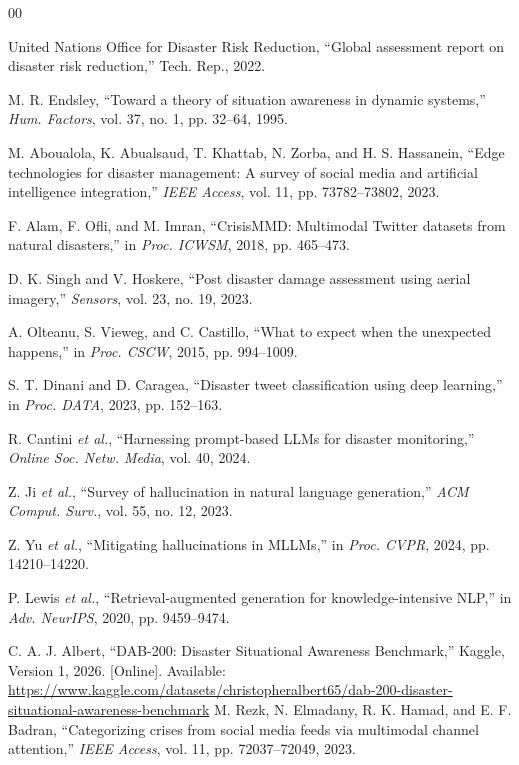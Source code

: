\documentclass[conference]{IEEEtran}
\begin{document}
\begin{thebibliography}{00}
\footnotesize
\setlength{\parskip}{0pt}
\setlength{\itemsep}{-1.2pt}

 United Nations Office for Disaster Risk Reduction, ``Global assessment report on disaster risk reduction,'' Tech. Rep., 2022.

 M. R. Endsley, ``Toward a theory of situation awareness in dynamic systems,'' \textit{Hum. Factors}, vol. 37, no. 1, pp. 32--64, 1995.

 M. Aboualola, K. Abualsaud, T. Khattab, N. Zorba, and H. S. Hassanein, ``Edge technologies for disaster management: A survey of social media and artificial intelligence integration,'' \textit{IEEE Access}, vol. 11, pp. 73782--73802, 2023.

 F. Alam, F. Ofli, and M. Imran, ``CrisisMMD: Multimodal Twitter datasets from natural disasters,'' in \textit{Proc. ICWSM}, 2018, pp. 465--473.

 D. K. Singh and V. Hoskere, ``Post disaster damage assessment using aerial imagery,'' \textit{Sensors}, vol. 23, no. 19, 2023.

 A. Olteanu, S. Vieweg, and C. Castillo, ``What to expect when the unexpected happens,'' in \textit{Proc. CSCW}, 2015, pp. 994--1009.

 S. T. Dinani and D. Caragea, ``Disaster tweet classification using deep learning,'' in \textit{Proc. DATA}, 2023, pp. 152--163.

 R. Cantini \textit{et al.}, ``Harnessing prompt-based LLMs for disaster monitoring,'' \textit{Online Soc. Netw. Media}, vol. 40, 2024.

 Z. Ji \textit{et al.}, ``Survey of hallucination in natural language generation,'' \textit{ACM Comput. Surv.}, vol. 55, no. 12, 2023.

 Z. Yu \textit{et al.}, ``Mitigating hallucinations in MLLMs,'' in \textit{Proc. CVPR}, 2024, pp. 14210--14220.

 P. Lewis \textit{et al.}, ``Retrieval-augmented generation for knowledge-intensive NLP,'' in \textit{Adv. NeurIPS}, 2020, pp. 9459--9474.

C. A. J. Albert,
``DAB-200: Disaster Situational Awareness Benchmark,''
Kaggle, Version 1, 2026. [Online]. Available:
\url{https://www.kaggle.com/datasets/christopheralbert65/dab-200-disaster-situational-awareness-benchmark}
 M. Rezk, N. Elmadany, R. K. Hamad, and E. F. Badran, ``Categorizing crises from social media feeds via multimodal channel attention,'' \textit{IEEE Access}, vol. 11, pp. 72037--72049, 2023.


\end{thebibliography}
\end{document}
